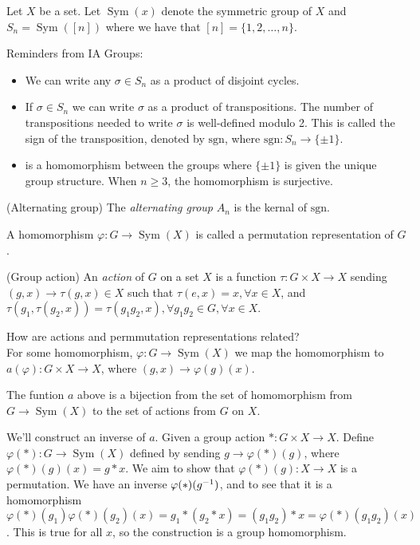 \documentclass{article}
\DeclareMathOperator{\sym}{Sym}
\begin{document}
\begin{itemize}
\begin{definition}
	Let $ X $ be a set. Let $ \sym(x) $ denote the symmetric group of $ X $ and $ S_n=\sym([n]) $ where we have that $ [n]=\{1,2,\dots, n\} $.
\end{definition}
Reminders from IA Groups:
\begin{itemize}
	\item We can write any $ \sigma\in S_n $ as a product of disjoint cycles.
	\item If $ \sigma \in S_n $ we can write $ \sigma $ as a product of transpositions. The number of transpositions needed to write $ \sigma $ is well-defined modulo 2. This is called the sign of the transposition, denoted by $ \mathrm {sgn} $, where $ \mathrm{sgn}: S_n\to \{\pm 1\} $.
	\item {} is a homomorphism between the groups where $ \{\pm 1\} $ is given the unique group structure. When $ n\ge 3 $, the homomorphism is surjective.
\end{itemize}
\begin{definition}
	(Alternating group) The \textit{alternating group} $ A_n $ is the kernal of $ \mathrm{sgn} $.
\end{definition}
A homomorphism $ \varphi: G\to \sym(X) $ is called a permutation representation of $ G $.
\begin{definition}
	(Group action) An \textit{action} of $ G $ on a set $ X $ is a function $ \tau:G\times X\to X $ sending $ (g,x) \to \tau(g,x)\in X $ such that $ \tau(e,x)=x, \forall x\in X $, and $ \tau(g_1,\tau(g_2,x))=\tau(g_1g_2,x), \forall g_1g_2\in G, \forall x\in X $.
\end{definition}
How are actions and permmutation representations related?\\
For some homomorphism, $ \varphi: G\to\sym(X) $ we map the homomorphism to $ a(\varphi):G\times X\to X $, where $ (g,x)\to\varphi(g)(x) $.
\begin{proposition}
  The funtion $ a $ above is a bijection from the set of homomorphism from $ G\to\sym(X) $ to the set of actions from $ G $ on $ X $.
\end{proposition}
\pf We'll construct an inverse of $ a $. Given a group action $ *:G\times X \to X $. Define $ \varphi(*): G\to \sym(X) $ defined by sending $ g\to\varphi(*)(g) $, where $ \varphi(*)(g)(x)=g*x $. We aim to show that $ \varphi(*)(g):X\to X $ is a permutation. We have an inverse $ \varphi(*)({g}^{-1}) $, and to see that it is a homomorphism $ \varphi(*)(g_1)\varphi(*)(g_2)(x)=g_1*(g_2*x)=(g_1g_2)*x=\varphi(*)(g_1g_2)(x) $. This is true for all $ x $, so the construction is a group homomorphism.\\

\end{itemize}
\end{document}
